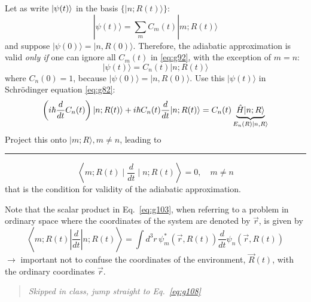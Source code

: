 \documentclass[12pt]{article}
\newcommand{\be}{\begin{equation}}
\newcommand{\ee}{\end{equation}}
\begin{document}
Let as write $\ket{\psi(t)}$ in the basis $\{|n ; R(t)\rangle\}$:
\be
|\psi(t)\rangle=\sum_{m} C_{m}(t)|m ; R(t)\rangle
\label{eq:g101}
\ee
and suppose $|\psi(0)\rangle=|n, R(0)\rangle$. Therefore, the
adiabatic approximation is valid \textit{only if} one
can ignore all $C_m(t)$ in \eqref{eq:g92}, with the exception
of $m=n$:
\be
|\psi(t)\rangle=C_{n}(t)|n ; R(t)\rangle
\ee
where $C_n(0)=1$, because $|\psi(0)\rangle=|n, R(0)\rangle$.
Use this $|\psi(t)\rangle$ in Schrödinger equation \eqref{eq:g82}:
\[
\left(i \hbar \frac{d}{d t} C_{n}(t)\right)
|n ; R(t)\rangle+i \hbar C_{n}(t) \frac{d}{d t}|n ; R(t)\rangle=
C_{n}(t) \underbrace{\hat{H}|n ; R\rangle}%
_{E_n(R)\ket{n,R}}
\]
Project this onto $|m ; R\rangle, m \neq n$,
leading to\\
\rule{\textwidth}{1pt}
\be
\left\langle m ; R(t) \mid \frac{d}{d t} \mid n ; R(t)\right\rangle=0, \quad m \neq n
\label{eq:g103}
\ee
that is the condition for validity of the adiabatic approximation.

Note that the scalar product in Eq.~\eqref{eq:g103}, when
referring to a problem in ordinary space where
the coordinates of the system are denoted by $\vec{r}$,
is given by
\be
\left\langle m ; R(t)\left|\frac{d}{d t}\right| n ; R(t)\right\rangle=\int d^{3} r\, \psi_{m}^{*}(\vec{r}, R(t)) \frac{d}{d t} \psi_{n}(\vec{r}, R(t))
\ee
$\rightarrow$
important not to confuse the
coordinates of the environment, $\vec{R}(t)$,
with the ordinary coordinates $\vec{r}$.

\begin{quote}\emph{Skipped in class, jump straight to Eq.~\eqref{eq:g108}}\end{quote}
\end{document}
